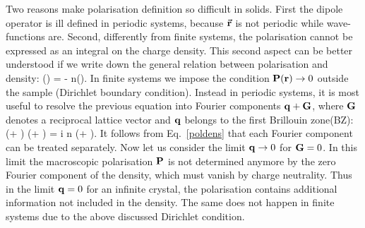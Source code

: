 Two reasons make polarisation definition so difficult in solids. First the dipole operator is ill defined in periodic systems, because $\vec {{\bf r}}$ is not periodic while wave-functions are. Second, differently from finite systems, the polarisation cannot be expressed as an integral on the charge density\cite{Martin1998}.
This second aspect can be better understood if we write down the general relation between polarisation and density:
\be
\nabla \cdot \PP(\rr) = - n(\rr).
\ee                              
In finite systems we impose the condition  ${\bf P}({\bf r}) \rightarrow 0 $ outside the sample (Dirichlet boundary condition).  Instead in periodic systems, it is most useful to resolve the previous equation into Fourier components ${\bf q}+ {\bf G}$,
where ${\bf G}$ denotes a reciprocal lattice vector and ${\bf q}$ belongs to the first Brillouin zone(BZ):
\be
(\qq + \GG) \cdot \PP(\qq + \GG) = i n (\qq + \GG).
\label{poldens}
\ee
It follows from Eq.~\ref{poldens} that each Fourier component can be treated separately. Now let us consider the limit ${\bf q} \rightarrow 0$ for ${\bf G}=0$. In this limit  the macroscopic polarisation ${\bf P}$ is not determined anymore by the zero Fourier component of the density, which must vanish by charge neutrality.  Thus in the limit ${\bf q} = 0$ for an infinite crystal, the polarisation contains additional information not included in the density.\cite{Martin1998} The same does not happen in finite systems due to the above discussed Dirichlet condition.
